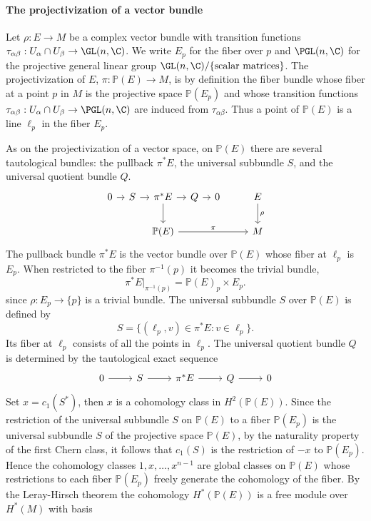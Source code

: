 \paragraph{The projectivization of a vector bundle}
Let $\rho:E\to M$ be a complex vector bundle with transition functions $\tau_{\alpha\beta}:U_\alpha\cap U_\beta\to\GL(n,\C)$. We write $E_p$ for the fiber over $p$ and 
$\PGL(n,\C)$ for the projective general linear group $\GL(n,\C)/\{\text{scalar matrices}\}$. The projectivization of $E$, $\pi:\mathbb{P}(E)\to M$, is by definition the 
fiber bundle whose fiber at a point $p$ in $M$ is the projective space $\mathbb{P}(E_p)$ and whose transition functions 
$\tau_{\alpha\beta}:U_{\alpha}\cap U_\beta\to\PGL(n,\C)$ are induced from $\tau_{\alpha\beta}$. Thus a point of $\mathbb{P}(E)$ is a line $\ell_p$ in the fiber $E_p$.\par
As on the projectivization of a vector space, on $\mathbb{P}(E)$ there are several tautological bundles: the pullback $\pi^*E$, the universal subbundle $S$, and the 
universal quotient bundle $Q$.
\[\begin{tikzcd}[column sep=0.8em]
0\ar[r]&S\ar[r]&\pi^*E\ar[d]\ar[r]&Q\ar[r]&0&&&E\ar[d,"\rho"]\\
&&\mathbb{P}(E)\ar[rrrrr,"\pi"]&&&&&M
\end{tikzcd}\]
The pullback bundle $\pi^*E$ is the vector bundle over $\mathbb{P}(E)$ whose fiber at $\ell_p$ is $E_p$. When restricted to the fiber $\pi^{-1}(p)$ it becomes the 
trivial bundle,
\[\pi^*E|_{\pi^{-1}(p)}=\mathbb{P}(E)_p\times E_p.\]
since $\rho:E_p\to\{p\}$ is a trivial bundle. The universal subbundle $S$ over $\mathbb{P}(E)$ is defined by
\[S=\{(\ell_p,v)\in\pi^*E:v\in\ell_p\}.\]
Its fiber at $\ell_p$ consists of all the points in $\ell_p$. The universal quotient bundle $Q$ is determined by the tautological exact sequence
\[\begin{tikzcd}
0\ar[r]&S\ar[r]&\pi^*E\ar[r]&Q\ar[r]&0
\end{tikzcd}\]
Set $x=c_1(S^*)$, then $x$ is a cohomology class in $H^2(\mathbb{P}(E))$. Since the restriction of the universal subbundle $S$ on $\mathbb{P}(E)$ to a fiber 
$\mathbb{P}(E_p)$ is the universal subbundle $S$ of the projective space $\mathbb{P}(E)$, by the naturality property of the first Chern class, it follows that $c_1(S)$ 
is the restriction of $-x$ to $\mathbb{P}(E_p)$. Hence the cohomology classes $1,x,\dots,x^{n-1}$ are global classes on $\mathbb{P}(E)$ whose restrictions to each fiber 
$\mathbb{P}(E_p)$ freely generate the cohomology of the fiber. By the Leray-Hirsch theorem the cohomology $H^*(\mathbb{P}(E))$ is a free module over $H^*(M)$ with basis 

